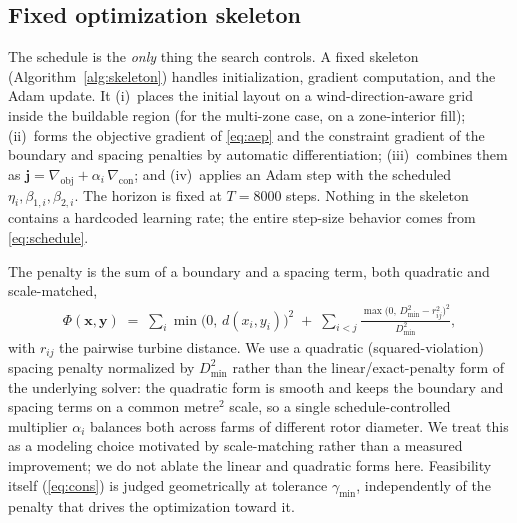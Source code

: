 \documentclass[11pt]{article}
\newcommand{\gm}{\gamma_{\min}}
\newcommand{\Dmin}{D_{\min}}
\begin{document}
\subsection{Fixed optimization skeleton}
\label{sec:skeleton}
The schedule is the \emph{only} thing the search controls. A fixed skeleton
(Algorithm~\ref{alg:skeleton}) handles initialization, gradient computation, and the
Adam update. It (i)~places the initial layout on a wind-direction-aware grid inside
the buildable region (for the multi-zone case, on a zone-interior fill); (ii)~forms
the objective gradient of \cref{eq:aep} and the constraint gradient of the boundary
and spacing penalties by automatic differentiation; (iii)~combines them as
$\bm j = \nabla_{\!\text{obj}} + \alpha_i\,\nabla_{\!\text{con}}$; and (iv)~applies an
Adam step with the scheduled $\eta_i,\beta_{1,i},\beta_{2,i}$. The horizon is fixed at
$T=8000$ steps. Nothing in the skeleton contains a hardcoded learning rate; the entire
step-size behavior comes from \cref{eq:schedule}.

The penalty is the sum of a boundary and a spacing term, both quadratic and
scale-matched,
\begin{align}
\Phi(\bm x,\bm y) \;=\; \sum_i \min\!\big(0,\,d(x_i,y_i)\big)^2
\;+\; \sum_{i<j}\frac{\max\!\big(0,\,\Dmin^2-r_{ij}^2\big)^2}{\Dmin^2},
\label{eq:penalty}
\end{align}
with $r_{ij}$ the pairwise turbine distance. We use a quadratic (squared-violation)
spacing penalty normalized by $\Dmin^2$ rather than the linear/exact-penalty form of the
underlying solver: the quadratic form is smooth and keeps the boundary and spacing terms
on a common metre$^2$ scale, so a single schedule-controlled multiplier $\alpha_i$
balances both across farms of different rotor diameter. We treat this as a modeling
choice motivated by scale-matching rather than a measured improvement; we do not ablate
the linear and quadratic forms here. Feasibility itself
(\cref{eq:cons}) is judged geometrically at tolerance $\gm$, independently of the penalty
that drives the optimization toward it.
\end{document}
